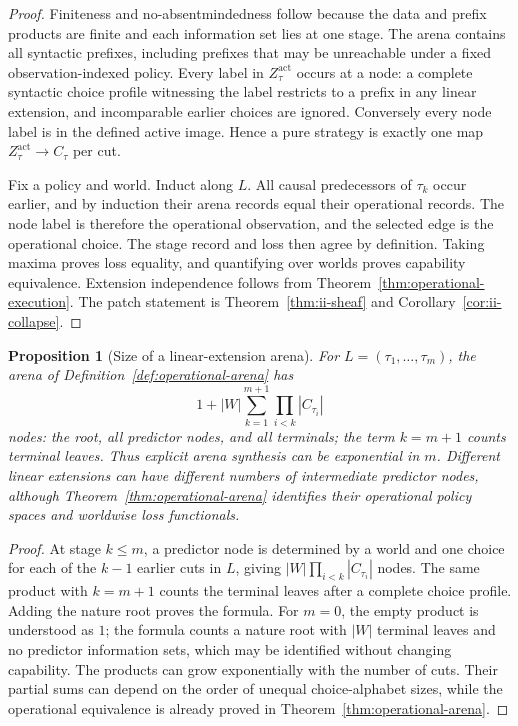 \documentclass[11pt]{article}
\theoremstyle{plain}
\newtheorem{proposition}[theorem]{Proposition}
\theoremstyle{definition}
\theoremstyle{remark}
\begin{document}
\begin{proof}
Finiteness and no-absentmindedness follow because the data and prefix products
are finite and each information set lies at one stage. The arena contains all
syntactic prefixes, including prefixes that may be unreachable under a fixed
observation-indexed policy. Every label in $Z_\tau^{\mathrm{act}}$ occurs at a
node: a complete syntactic choice profile
witnessing the label restricts to a prefix in any linear extension, and
incomparable earlier choices are ignored. Conversely every node label is in the
defined active image. Hence a pure strategy is exactly one map
$Z_\tau^{\mathrm{act}}\to C_\tau$ per cut.

Fix a policy and world. Induct along $L$. All causal predecessors of
$\tau_k$ occur earlier, and by induction their arena records equal their
operational records. The node label is therefore the operational observation,
and the selected edge is the operational choice. The stage record and loss then
agree by definition. Taking maxima proves loss equality, and quantifying over
worlds proves capability equivalence. Extension independence follows from
Theorem~\ref{thm:operational-execution}. The patch statement is
Theorem~\ref{thm:ii-sheaf} and Corollary~\ref{cor:ii-collapse}.
\end{proof}


\begin{proposition}[Size of a linear-extension arena]
\label{prop:operational-arena-size}
For $L=(\tau_1,\ldots,\tau_m)$, the arena of
Definition~\ref{def:operational-arena} has
\[
1+|W|\sum_{k=1}^{m+1}\prod_{i<k}|C_{\tau_i}|
\]
nodes: the root, all predictor nodes, and all terminals; the term $k=m+1$ counts
terminal leaves. Thus explicit arena
synthesis can be exponential in $m$. Different linear extensions can have
different numbers of intermediate predictor nodes, although
Theorem~\ref{thm:operational-arena} identifies their operational policy spaces
and worldwise loss functionals.
\end{proposition}

\begin{proof}
At stage $k\le m$, a predictor node is determined by a world and one choice for
each of the $k-1$ earlier cuts in $L$, giving
$|W|\prod_{i<k}|C_{\tau_i}|$ nodes. The same product with $k=m+1$ counts the
terminal leaves after a complete choice profile. Adding the nature root proves
the formula. For $m=0$, the empty product is understood as $1$; the formula
counts a nature root with $|W|$ terminal leaves and no predictor information
sets, which may be identified without changing capability. The products can grow
exponentially with the number of cuts. Their partial sums can depend on the
order of unequal choice-alphabet sizes, while the operational equivalence is
already proved in Theorem~\ref{thm:operational-arena}.
\end{proof}
\end{document}
